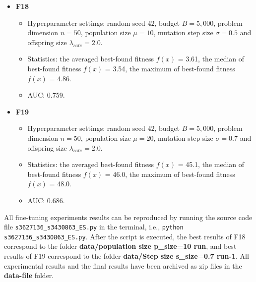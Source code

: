 \documentclass{article}
\begin{document}
\begin{itemize}
    \item \textbf{F18}
        \begin{itemize}
            \item Hyperparameter settings: random seed $42$, budget $B = 5,000$, problem dimension $n = 50$, population size $\mu = 10$, mutation step size $\sigma = 0.5$ and offspring size $\lambda_{rate} = 2.0$.
            \item Statistics: the averaged best-found fitness $f(x)$ = 3.61, the median of best-found fitness $f(x)$ = 3.54, the maximum of best-found fitness $f(x)$ = 4.86.
            \item AUC: 0.759.
        \end{itemize}
    \item \textbf{F19}
        \begin{itemize}
            \item Hyperparameter settings: random seed $42$, budget $B = 5,000$, problem dimension $n = 50$, population size $\mu = 20$, mutation step size $\sigma = 0.7$ and offspring size $\lambda_{rate} = 2.0$.
            \item Statistics: the averaged best-found fitness $f(x)$ = 45.1, the median of best-found fitness $f(x)$ = 46.0, the maximum of best-found fitness $f(x)$ = 48.0.
            \item AUC: 0.686.
        \end{itemize}
\end{itemize}

 All fine-tuning experiments results can be reproduced by running the source code file \texttt{s3627136\_s3430863\_ES.py} in the terminal, i.e., \texttt{python s3627136\_s3430863\_ES.py}. After the script is executed, the best results of F18 correspond to the folder \textbf{data/population size p\_size=10 run}, and best results of F19 correspond to the folder \textbf{data/Step size s\_size=0.7 run-1}. All experimental results and the final results have been archived as zip files in the \textbf{data-file} folder. 
\end{document}
